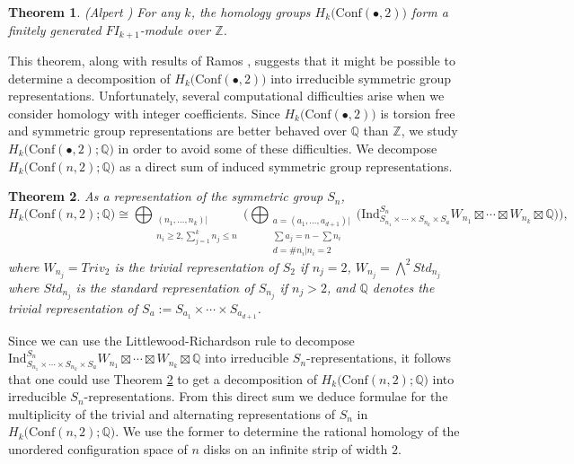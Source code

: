 \documentclass[12py]{amsart}%
\newtheorem{thm}{Theorem}[section]
\theoremstyle{definition}\newtheorem{definition}[thm]{Definition}
\theoremstyle{definition}
\newcommand{\Z}{\ensuremath{\mathbb{Z}}}
\newcommand{\Q}{\ensuremath{\mathbb{Q}}}
\begin{document}
\begin{thm}
(Alpert \cite[Theorem 6.1]{alpert2020generalized}) For any $k$, the homology groups $H_{k}\big(\text{Conf}(\bullet,2)\big)$ form a finitely generated $FI_{k+1}$-module over $\Z$.
\end{thm}

This theorem, along with results of Ramos \cite{ramos2017generalized}, suggests that it might be possible to determine a decomposition of $H_{k}\big(\text{Conf}(\bullet,2)\big)$ into irreducible symmetric group representations. Unfortunately, several computational difficulties arise when we consider homology with integer coefficients. Since $H_{k}\big(\text{Conf}(\bullet,2)\big)$ is torsion free \cite[Theorem 4.3]{alpert2020generalized} and symmetric group representations are better behaved over $\Q$ than $\Z$, we study $H_{k}\big(\text{Conf}(\bullet,2);\Q\big)$ in order to avoid some of these difficulties. We decompose $H_{k}\big(\text{Conf}(n, 2);\Q\big)$ as a direct sum of induced symmetric group representations.

\begin{thm}\label{mainthm}
As a representation of the symmetric group $S_{n}$, 
\[
H_{k}\big(\text{Conf}(n,2);\Q\big)\cong \bigoplus_{\substack{(n_{1},\dots, n_{k})|\\n_{i}\ge 2, \sum_{j=1}^{k}n_{j}\le n}}\Big(\bigoplus_{\substack{a=(a_{1},\dots, a_{d+1})|\\\sum a_{j}=n-\sum n_{i}\\d=\#n_{i}|n_{i}=2}}\big(\text{Ind}^{S_{n}}_{S_{n_{1}}\times\cdots\times S_{n_{k}}\times S_{a}}W_{n_{1}}\boxtimes\cdots\boxtimes W_{n_{k}}\boxtimes \Q\big)\Big),
\]
where $W_{n_{j}}=Triv_{2}$ is the trivial representation of $S_{2}$ if $n_{j}=2$, $W_{n_{j}}=\bigwedge^{2}Std_{n_{j}}$ where $Std_{n_{j}}$ is the standard representation of $S_{n_{j}}$  if $n_{j}>2$, and $\Q$ denotes the trivial representation of $S_{a}:=S_{a_{1}}\times\cdots \times S_{a_{d+1}}$.
\end{thm}

Since we can use the Littlewood-Richardson rule to decompose $\text{Ind}^{S_{n}}_{S_{n_{1}}\times\cdots\times S_{n_{k}}\times S_{a}}W_{n_{1}}\boxtimes\cdots\boxtimes W_{n_{k}}\boxtimes \Q$ into irreducible $S_{n}$-representations, it follows that one could use Theorem \ref{mainthm} to get a decomposition of $H_{k}\big(\text{Conf}(n,2);\Q\big)$ into irreducible $S_{n}$-representations. From this direct sum we deduce formulae for the multiplicity of the trivial and alternating representations of $S_{n}$ in $H_{k}\big(\text{Conf}(n,2);\Q\big)$. We use the former to determine the rational homology of the unordered configuration space of $n$ disks on an infinite strip of width $2$.
\end{document}
